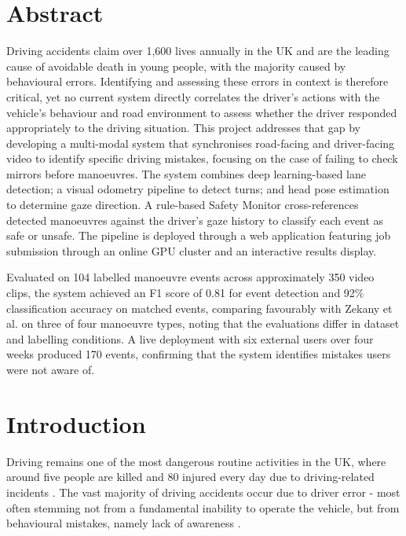 \documentclass{article}
\begin{document}
\newpage

\section*{Abstract}
Driving accidents claim over 1,600 lives annually in the UK and are the leading cause of avoidable death in young people, with the majority caused by behavioural errors. Identifying and assessing these errors in context is therefore critical, yet no current system directly correlates the driver's actions with the vehicle's behaviour and road environment to assess whether the driver responded appropriately to the driving situation. This project addresses that gap by developing a multi-modal system that synchronises road-facing and driver-facing video to identify specific driving mistakes, focusing on the case of failing to check mirrors before manoeuvres. The system combines deep learning-based lane detection; a visual odometry pipeline to detect turns; and head pose estimation to determine gaze direction. A rule-based Safety Monitor cross-references detected manoeuvres against the driver's gaze history to classify each event as safe or unsafe. The pipeline is deployed through a web application featuring job submission through an online GPU cluster and an interactive results display. 

Evaluated on 104 labelled manoeuvre events across approximately 350 video clips, the system achieved an F1 score of 0.81 for event detection and 92\% classification accuracy on matched events, comparing favourably with Zekany et al. on three of four manoeuvre types, noting that the evaluations differ in dataset and labelling conditions. A live deployment with six external users over four weeks produced 170 events, confirming that the system identifies mistakes users were not aware of.

\newpage

\tableofcontents

\newpage

\section{Introduction}

Driving remains one of the most dangerous routine activities in the UK, where around five people are killed and 80 injured every day due to driving-related incidents \cite{govuk_casualties_2024}. The vast majority of driving accidents occur due to driver error - most often stemming not from a fundamental inability to operate the vehicle, but from behavioural mistakes, namely lack of awareness \cite{road_accident_data, dia_collisions}.
\end{document}
